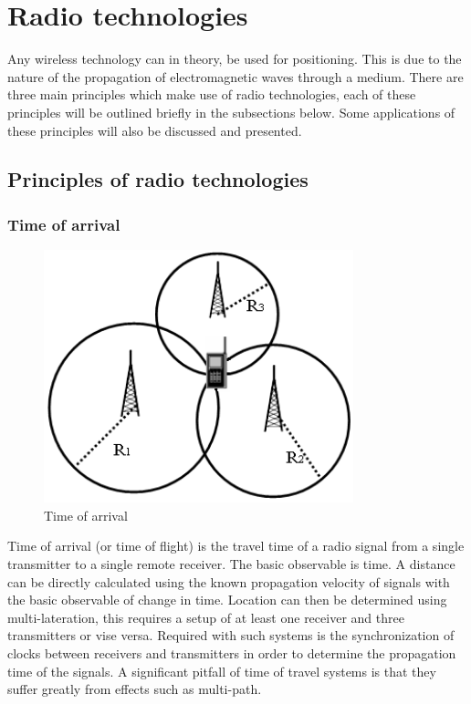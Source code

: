 \documentclass[11pt,a4paper]{report}
\begin{document}
	\section{Radio technologies}
		Any wireless technology can in theory, be used for positioning. This is due to the nature of the propagation of electromagnetic waves through a medium. There are three main principles which make use of radio technologies, each of these principles will be outlined briefly in the subsections below. Some applications of these principles will also be discussed and presented.
	
	\subsection{Principles of radio technologies}
		\subsubsection{Time of arrival}
			\begin{figure}[H]
				\centering
				\includegraphics[width=0.8\textwidth]{time_of_arrival}
				\caption{Time of arrival}
				\label{fig:time_of_arrival}
			\end{figure}
			
			Time of arrival (or time of flight) is the travel time of a radio signal from a single transmitter to a single remote receiver. The basic observable is time. A distance can be directly calculated using the known propagation velocity of signals with the basic observable of change in time. Location can then be determined using multi-lateration, this requires a setup of at least one receiver and three transmitters or vise versa.
			Required with such systems is the synchronization of clocks between receivers and transmitters in order to determine the propagation time of the signals.
			A significant pitfall of time of travel systems is that they suffer greatly from effects such as multi-path.
			\cite{k._pahlavan_wideband_1998}
			
\end{document}
